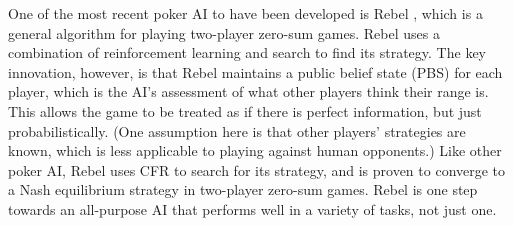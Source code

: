 \documentclass{article}
\begin{document}
\begin{multicols*}{2}
\newline
One of the most recent poker AI to have been developed is Rebel \cite{Rebel1} \cite{Rebel2}, which is a general algorithm for playing two-player zero-sum games. Rebel uses a combination of reinforcement learning and search to find its strategy. The key innovation, however, is that Rebel maintains a public belief state (PBS) for each player, which is the AI’s assessment of what other players think their range is. This allows the game to be treated as if there is perfect information, but just probabilistically. (One assumption here is that other players’ strategies are known, which is less applicable to playing against human opponents.) Like other poker AI, Rebel uses CFR to search for its strategy, and is proven to converge to a Nash equilibrium strategy in two-player zero-sum games. Rebel is one step towards an all-purpose AI that performs well in a variety of tasks, not just one.

\end{multicols*}
\end{document}

